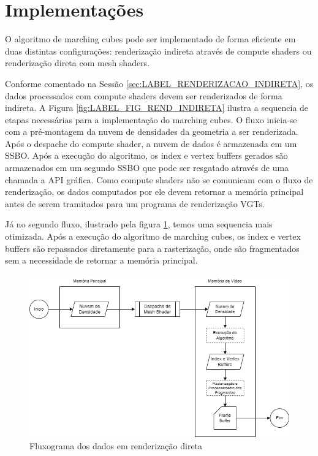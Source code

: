 \section{Implementações}\label{sec:LABEL_FLUXO_DOS_DADOS}

O algoritmo de marching cubes pode ser implementado de forma eficiente em duas distintas configurações: renderização indireta através de compute shaders ou renderização direta com mesh shaders.

Conforme comentado na Sessão \ref{sec:LABEL_RENDERIZACAO_INDIRETA}, os dados processados com compute shaders devem ser renderizados de forma indireta. A Figura \ref{fig:LABEL_FIG_REND_INDIRETA} ilustra a sequencia de etapas necessárias para a implementação do marching cubes. O fluxo inicia-se com a pré-montagem da nuvem de densidades da geometria a ser renderizada. Após o despache do compute shader, a nuvem de dados é armazenada em um SSBO. Após a execução do algoritmo, os index e vertex buffers gerados são armazenados em um segundo SSBO que pode ser resgatado através de uma chamada a API gráfica. Como compute shaders não se comunicam com o fluxo de renderização, os dados computados por ele devem retornar a memória principal antes de serem tramitados para um programa de renderização VGTs.

Já no segundo fluxo, ilustrado pela figura \ref{fig:LABEL_FIG_REND_DIRETA}, temos uma sequencia mais otimizada. Após a execução do algoritmo de marching cubes, os index e vertex buffers são repassados diretamente para a rasterização, onde são fragmentados sem a necessidade de retornar a memória principal.

\begin{figure}
\centering
\includegraphics[width=1\textwidth]{imagens/FluxoDados-RendDireta.drawio.png}
\caption{Fluxograma dos dados em renderização direta}
\label{fig:LABEL_FIG_REND_DIRETA}
\end{figure}